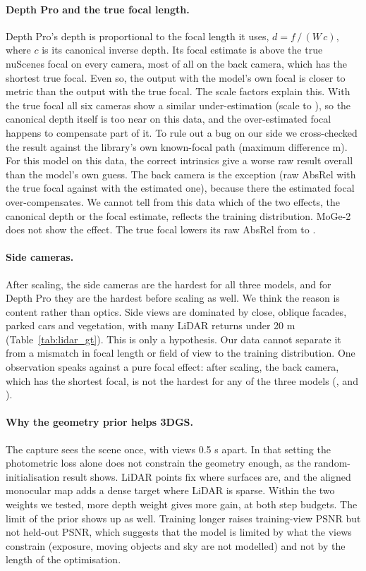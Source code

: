 \documentclass[10pt]{article}
\begin{document}
\paragraph{Depth Pro and the true focal length.}
Depth Pro's depth is proportional to the focal length it uses, $d = f\,/\,(W\,c)$, where $c$ is its
canonical inverse depth. Its focal estimate is above the true nuScenes focal on every camera, most of all
on the back camera, which has the shortest true focal. Even so, the output with the model's own focal is
closer to metric than the output with the true focal. The scale factors explain this. With the true focal
all six cameras show a similar under-estimation (scale \GTFscaleMin{} to \GTFscaleMax), so the canonical
depth itself is too near on this data, and the over-estimated focal happens to compensate part of it. To
rule out a bug on our side we cross-checked the result against the library's own known-focal path (maximum
difference \FocalCheckMaxDiff{} m). For this model on this data, the correct intrinsics give a worse raw
result overall than the model's own guess. The back camera is the exception (raw AbsRel
\GTFabsrelBackRaw{} with the true focal against \DPabsrelBackRaw{} with the estimated one), because there
the estimated focal over-compensates. We cannot tell from this data which of the two effects, the canonical
depth or the focal estimate, reflects the training distribution. MoGe-2 does not show the effect. The true
focal lowers its raw AbsRel from \MOGEabsrelRaw{} to \MOGEGTFabsrelRaw.

\paragraph{Side cameras.}
After scaling, the side cameras are the hardest for all three models, and for Depth Pro they are the
hardest before scaling as well. We think the reason is content rather than optics. Side views are dominated
by close, oblique facades, parked cars and vegetation, with many LiDAR returns under 20 m
(Table~\ref{tab:lidar_gt}). This is only a hypothesis. Our data cannot separate it from a mismatch in focal
length or field of view to the training distribution. One observation speaks against a pure focal effect:
after scaling, the back camera, which has the shortest focal, is not the hardest for any of the three
models (\DPabsrelBackScaled, \DAVabsrelBackScaled{} and \MOGEabsrelBackScaled).

\paragraph{Why the geometry prior helps 3DGS.}
The capture sees the scene once, with views 0.5 s apart. In that setting the photometric loss alone does
not constrain the geometry enough, as the random-initialisation result shows. LiDAR points fix where
surfaces are, and the aligned monocular map adds a dense target where LiDAR is sparse. Within the two
weights we tested, more depth weight gives more gain, at both step budgets. The limit of the prior shows up
as well. Training longer raises training-view PSNR but not held-out PSNR, which suggests that the model is
limited by what the views constrain (exposure, moving objects and sky are not modelled) and not by the
length of the optimisation.
\end{document}
